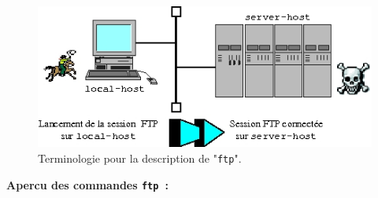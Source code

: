 \begin{figure}[hbtp]
\centering
\includegraphics{./_Images/cmds-net/ftpdesc.jpg}
\caption{\label{fig-cmdnet-ftpdesc}Terminologie pour la description de
		"{\tt ftp}".}
\end{figure}

{\bf Apercu des commandes {\tt ftp}~:}\\
